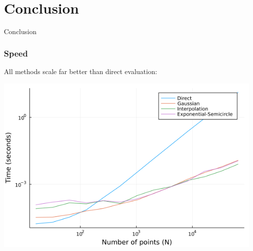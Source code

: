 \documentclass{beamer}
\begin{document}
\section{Conclusion}

\begin{frame}{Conclusion}
\begin{frame}
  \frametitle{Speed}
  All methods scale far better than direct evaluation:

  \vfill

  \centering \includegraphics[width=.8\textwidth]{images/n_vs_time.png}


\end{frame}
\end{frame}
\end{document}
